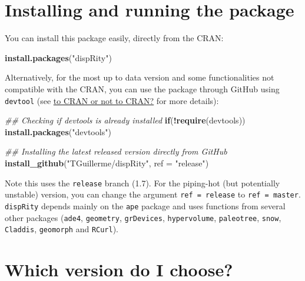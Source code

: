 \documentclass[
]{book}
\newenvironment{Shaded}{\begin{snugshade}}{\end{snugshade}}
\newcommand{\CommentTok}[1]{\textcolor[rgb]{0.56,0.35,0.01}{\textit{#1}}}
\newcommand{\ControlFlowTok}[1]{\textcolor[rgb]{0.13,0.29,0.53}{\textbf{#1}}}
\newcommand{\DataTypeTok}[1]{\textcolor[rgb]{0.13,0.29,0.53}{#1}}
\newcommand{\KeywordTok}[1]{\textcolor[rgb]{0.13,0.29,0.53}{\textbf{#1}}}
\newcommand{\NormalTok}[1]{#1}
\newcommand{\OperatorTok}[1]{\textcolor[rgb]{0.81,0.36,0.00}{\textbf{#1}}}
\newcommand{\StringTok}[1]{\textcolor[rgb]{0.31,0.60,0.02}{#1}}
\begin{document}
\hypertarget{installing-and-running-the-package}{%
\section{Installing and running the package}\label{installing-and-running-the-package}}

You can install this package easily, directly from the CRAN:

\begin{Shaded}
\begin{Highlighting}[]
\KeywordTok{install.packages}\NormalTok{(}\StringTok{"dispRity"}\NormalTok{)}
\end{Highlighting}
\end{Shaded}

Alternatively, for the most up to data version and some functionalities not compatible with the CRAN, you can use the package through GitHub using \texttt{devtool} (see \protect\hyperlink{noCRAN}{to CRAN or not to CRAN?} for more details):

\begin{Shaded}
\begin{Highlighting}[]
\CommentTok{\#\# Checking if devtools is already installed}
\ControlFlowTok{if}\NormalTok{(}\OperatorTok{!}\KeywordTok{require}\NormalTok{(devtools)) }\KeywordTok{install.packages}\NormalTok{(}\StringTok{"devtools"}\NormalTok{)}

\CommentTok{\#\# Installing the latest released version directly from GitHub}
\KeywordTok{install\_github}\NormalTok{(}\StringTok{"TGuillerme/dispRity"}\NormalTok{, }\DataTypeTok{ref =} \StringTok{"release"}\NormalTok{)}
\end{Highlighting}
\end{Shaded}

Note this uses the \texttt{release} branch (1.7).
For the piping-hot (but potentially unstable) version, you can change the argument \texttt{ref\ =\ release} to \texttt{ref\ =\ master}.
\texttt{dispRity} depends mainly on the \texttt{ape} package and uses functions from several other packages (\texttt{ade4}, \texttt{geometry}, \texttt{grDevices}, \texttt{hypervolume}, \texttt{paleotree}, \texttt{snow}, \texttt{Claddis}, \texttt{geomorph} and \texttt{RCurl}).

\hypertarget{version}{%
\section{Which version do I choose?}\label{version}}
\end{document}
